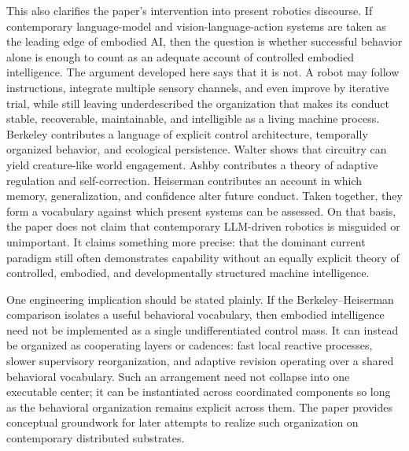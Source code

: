 \documentclass[11pt]{article}
\begin{document}
This also clarifies the paper's intervention into present robotics discourse. If contemporary language-model and vision-language-action systems are taken as the leading edge of embodied AI, then the question is whether successful behavior alone is enough to count as an adequate account of controlled embodied intelligence. The argument developed here says that it is not. A robot may follow instructions, integrate multiple sensory channels, and even improve by iterative trial, while still leaving underdescribed the organization that makes its conduct stable, recoverable, maintainable, and intelligible as a living machine process. Berkeley contributes a language of explicit control architecture, temporally organized behavior, and ecological persistence. Walter shows that circuitry can yield creature-like world engagement. Ashby contributes a theory of adaptive regulation and self-correction. Heiserman contributes an account in which memory, generalization, and confidence alter future conduct. Taken together, they form a vocabulary against which present systems can be assessed. On that basis, the paper does not claim that contemporary LLM-driven robotics is misguided or unimportant. It claims something more precise: that the dominant current paradigm still often demonstrates capability without an equally explicit theory of controlled, embodied, and developmentally structured machine intelligence.

One engineering implication should be stated plainly. If the
Berkeley--Heiserman comparison isolates a useful behavioral vocabulary, then embodied intelligence
need not be implemented as a single undifferentiated control mass. It can instead be organized as
cooperating layers or cadences: fast local reactive processes, slower supervisory reorganization,
and adaptive revision operating over a shared behavioral vocabulary. Such an arrangement need not
collapse into one executable center; it can be instantiated across coordinated components so long
as the behavioral organization remains explicit across them. The paper provides conceptual groundwork for later attempts to realize such
organization on contemporary distributed substrates.



\end{document}
